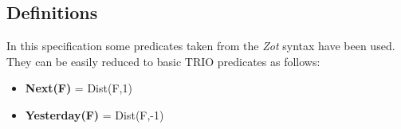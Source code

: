 \subsection{Definitions}

In this specification some predicates taken from the \textit{Zot} syntax have been used. They can be easily reduced to basic TRIO predicates as follows:
\begin {itemize}
\item \textbf{Next(F)} = Dist(F,1)
\item \textbf{Yesterday(F)} = Dist(F,-1)

\end {itemize}
